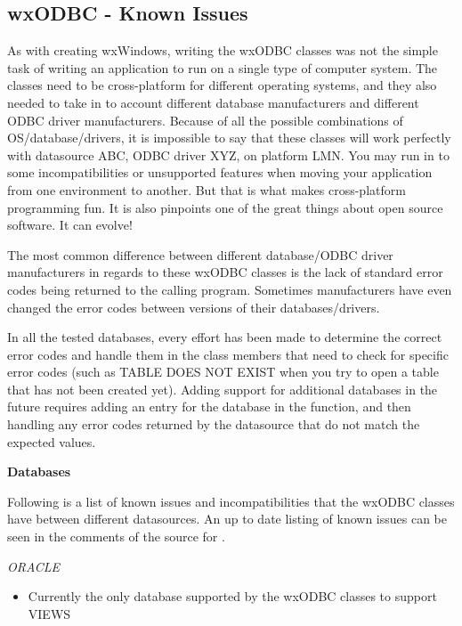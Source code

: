 
\subsection{wxODBC - Known Issues}\label{wxodbcknownissues}

As with creating wxWindows, writing the wxODBC classes was not the simple 
task of writing an application to run on a single type of computer system. 
The classes need to be cross-platform for different operating systems, and 
they also needed to take in to account different database manufacturers and 
different ODBC driver manufacturers. Because of all the possible combinations 
of OS/database/drivers, it is impossible to say that these classes will work 
perfectly with datasource ABC, ODBC driver XYZ, on platform LMN. You may run 
in to some incompatibilities or unsupported features when moving your 
application from one environment to another. But that is what makes 
cross-platform programming fun. It is also pinpoints one of the great 
things about open source software. It can evolve!

The most common difference between different database/ODBC driver 
manufacturers in regards to these wxODBC classes is the lack of 
standard error codes being returned to the calling program. Sometimes 
manufacturers have even changed the error codes between versions of 
their databases/drivers. 

In all the tested databases, every effort has been made to determine 
the correct error codes and handle them in the class members that need 
to check for specific error codes (such as TABLE DOES NOT EXIST when 
you try to open a table that has not been created yet). Adding support 
for additional databases in the future requires adding an entry for the 
database in the  function, and then handling any error codes 
returned by the datasource that do not match the expected values.

{\bf Databases}

Following is a list of known issues and incompatibilities that the 
wxODBC classes have between different datasources. An up to date 
listing of known issues can be seen in the comments of the source 
for .

{\it ORACLE}
\begin{itemize}\itemsep=0pt
\item Currently the only database supported by the wxODBC classes to support VIEWS
\end{itemize}


